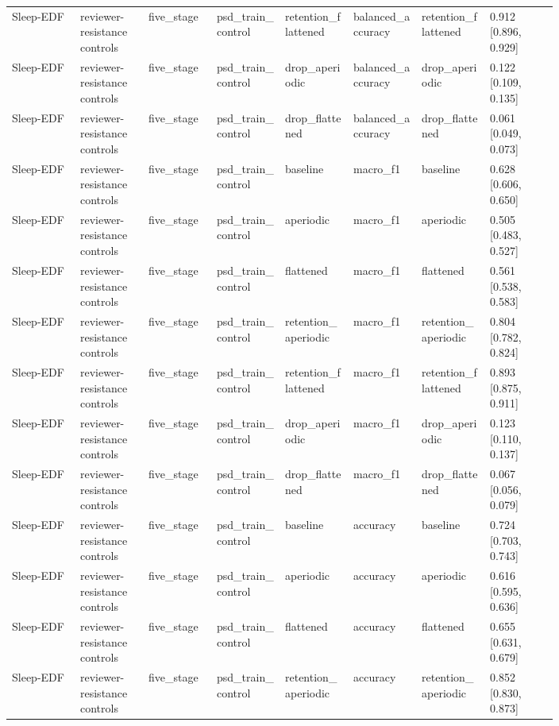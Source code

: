 \begin{longtable}{p{0.10\linewidth}p{0.10\linewidth}p{0.10\linewidth}p{0.10\linewidth}p{0.10\linewidth}p{0.10\linewidth}p{0.10\linewidth}p{0.10\linewidth}}
Sleep-EDF & reviewer-resistance controls & five\_stage & psd\_train\_control & retention\_flattened & balanced\_accuracy & retention\_flattened & 0.912 [0.896, 0.929]\\
Sleep-EDF & reviewer-resistance controls & five\_stage & psd\_train\_control & drop\_aperiodic & balanced\_accuracy & drop\_aperiodic & 0.122 [0.109, 0.135]\\
Sleep-EDF & reviewer-resistance controls & five\_stage & psd\_train\_control & drop\_flattened & balanced\_accuracy & drop\_flattened & 0.061 [0.049, 0.073]\\
Sleep-EDF & reviewer-resistance controls & five\_stage & psd\_train\_control & baseline & macro\_f1 & baseline & 0.628 [0.606, 0.650]\\
Sleep-EDF & reviewer-resistance controls & five\_stage & psd\_train\_control & aperiodic & macro\_f1 & aperiodic & 0.505 [0.483, 0.527]\\
Sleep-EDF & reviewer-resistance controls & five\_stage & psd\_train\_control & flattened & macro\_f1 & flattened & 0.561 [0.538, 0.583]\\
Sleep-EDF & reviewer-resistance controls & five\_stage & psd\_train\_control & retention\_aperiodic & macro\_f1 & retention\_aperiodic & 0.804 [0.782, 0.824]\\
Sleep-EDF & reviewer-resistance controls & five\_stage & psd\_train\_control & retention\_flattened & macro\_f1 & retention\_flattened & 0.893 [0.875, 0.911]\\
Sleep-EDF & reviewer-resistance controls & five\_stage & psd\_train\_control & drop\_aperiodic & macro\_f1 & drop\_aperiodic & 0.123 [0.110, 0.137]\\
Sleep-EDF & reviewer-resistance controls & five\_stage & psd\_train\_control & drop\_flattened & macro\_f1 & drop\_flattened & 0.067 [0.056, 0.079]\\
Sleep-EDF & reviewer-resistance controls & five\_stage & psd\_train\_control & baseline & accuracy & baseline & 0.724 [0.703, 0.743]\\
Sleep-EDF & reviewer-resistance controls & five\_stage & psd\_train\_control & aperiodic & accuracy & aperiodic & 0.616 [0.595, 0.636]\\
Sleep-EDF & reviewer-resistance controls & five\_stage & psd\_train\_control & flattened & accuracy & flattened & 0.655 [0.631, 0.679]\\
Sleep-EDF & reviewer-resistance controls & five\_stage & psd\_train\_control & retention\_aperiodic & accuracy & retention\_aperiodic & 0.852 [0.830, 0.873]\\

\end{longtable}
